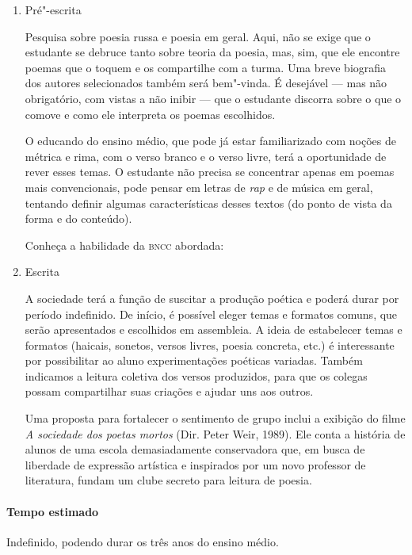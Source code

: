 \documentclass[11pt]{extarticle}
\begin{document}
\begin{enumerate}
\item
Pré"-escrita

Pesquisa sobre poesia russa e poesia em geral. Aqui, não se exige que
o estudante se debruce tanto sobre teoria da poesia, mas, sim, que ele
encontre poemas que o toquem e os compartilhe com a turma. Uma breve
biografia dos autores selecionados também será bem"-vinda. É desejável
--- mas não obrigatório, com vistas a não inibir --- que o estudante
discorra sobre o que o comove e como ele interpreta os poemas
escolhidos.

O educando do ensino médio, que pode já estar familiarizado com noções
de métrica e rima, com o verso branco e o verso livre, terá a
oportunidade de rever esses temas. O estudante não precisa se concentrar
apenas em poemas mais convencionais, pode pensar em letras de \emph{rap}
e de música em geral, tentando definir algumas características desses
textos (do ponto de vista da forma e do conteúdo).

Conheça a habilidade da \textsc{bncc} abordada:


\item
Escrita

A sociedade terá a função de suscitar a produção poética e poderá durar
por período indefinido. De início, é possível eleger temas e formatos
comuns, que serão apresentados e escolhidos em assembleia. A ideia de
estabelecer temas e formatos (haicais, sonetos, versos livres, poesia
concreta, etc.) é interessante por possibilitar ao aluno experimentações
poéticas variadas. Também indicamos a leitura coletiva dos versos
produzidos, para que os colegas possam compartilhar suas criações e
ajudar uns aos outros.

Uma proposta para fortalecer o sentimento de grupo inclui a exibição do
filme \emph{A sociedade dos poetas mortos} (Dir. Peter Weir, 1989).
Ele conta a história de alunos de uma escola demasiadamente conservadora
que, em busca de liberdade de expressão artística e inspirados por um
novo professor de literatura, fundam um clube secreto para leitura de
poesia.
\end{enumerate}

\paragraph{Tempo estimado} Indefinido, podendo durar os três anos do
ensino médio.
\end{document}
